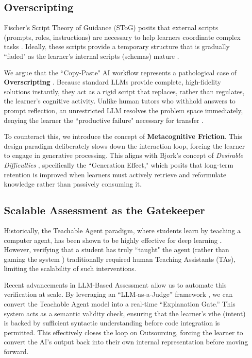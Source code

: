 \documentclass[sigconf]{acmart}
\begin{document}
\subsection{Overscripting}
Fischer's Script Theory of Guidance (SToG) posits that external scripts (prompts, roles, instructions) are necessary to help learners coordinate complex tasks \cite{fischer2013}. Ideally, these scripts provide a temporary structure that is gradually ``faded" as the learner's internal scripts (schemas) mature \cite{wecker2010fading}.

We argue that the ``Copy-Paste" AI workflow represents a pathological case of \textbf{Overscripting} \cite{dillenbourg2002over}. Because standard LLMs provide complete, high-fidelity solutions instantly, they act as a rigid script that replaces, rather than regulates, the learner's cognitive activity. Unlike human tutors who withhold answers to prompt reflection, an unrestricted LLM resolves the problem space immediately, denying the learner the ``productive failure" necessary for transfer \cite{kapur2008productive}.

To counteract this, we introduce the concept of \textbf{Metacognitive Friction}. This design paradigm deliberately slows down the interaction loop, forcing the learner to engage in generative processing. This aligns with Bjork's concept of \textit{Desirable Difficulties} \cite{bjork1994}, specifically the ``Generation Effect," which posits that long-term retention is improved when learners must actively retrieve and reformulate knowledge rather than passively consuming it.

\subsection{Scalable Assessment as the Gatekeeper}
Historically, the Teachable Agent paradigm, where students learn by teaching a computer agent, has been shown to be highly effective for deep learning \cite{biswas2005}. However, verifying that a student has truly ``taught" the agent (rather than gaming the system \cite{baker2005designing}) traditionally required human Teaching Assistants (TAs), limiting the scalability of such interventions.

Recent advancements in LLM-Based Assessment allow us to automate this verification at scale. By leveraging an ``LLM-as-a-Judge'' framework \cite{choma2025}, we can convert the Teachable Agent model into a real-time ``Explanation Gate.'' This system acts as a semantic validity check, ensuring that the learner's vibe (intent) is backed by sufficient syntactic understanding before code integration is permitted. This effectively closes the loop on Outsourcing, forcing the learner to convert the AI's output back into their own internal representation before moving forward.
\end{document}
